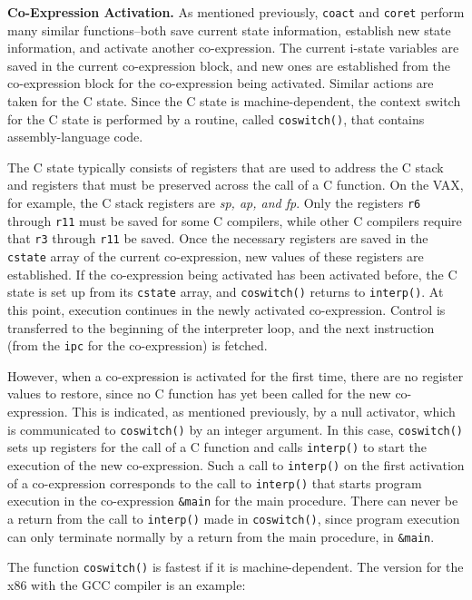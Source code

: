 \textbf{Co-Expression Activation.} As mentioned previously,
\texttt{coact} and \texttt{coret} perform many similar functions--both
save current state information, establish new state information, and
activate another co-expression.  The current i-state variables are
saved in the current co-expression block, and new ones are established
from the co-expression block for the co-expression being
activated. Similar actions are taken for the C state. Since the C
state is machine-dependent, the {\textquotedbl}context
switch{\textquotedbl} for the C state is performed by a routine,
called \texttt{coswitch()}, that contains assembly-language code.

The C state typically consists of registers that are used to address
the C stack and registers that must be preserved across the call of a
C function. On the VAX, for example, the C stack registers are
\textit{sp, ap, and fp}. Only the registers \texttt{r6} through
\texttt{r11} must be saved for some C compilers, while other C
compilers require that \texttt{r3} through \texttt{r11} be saved. Once
the necessary registers are saved in the \texttt{cstate} array of the
current co-expression, new values of these registers are
established. If the co-expression being activated has been activated
before, the C state is set up from its \texttt{cstate} array, and
\texttt{coswitch()} returns to \texttt{interp()}. At this point,
execution continues in the newly activated co-expression. Control is
transferred to the beginning of the interpreter loop, and the next
instruction (from the \texttt{ipc} for the co-expression) is fetched.

However, when a co-expression is activated for the first time, there
are no register values to restore, since no C function has yet been
called for the new co-expression. This is indicated, as mentioned
previously, by a null activator, which is communicated to
\texttt{coswitch()} by an integer argument. In this case,
\texttt{coswitch()} sets up registers for the call of a C function and
calls \texttt{interp()} to start the execution of the new
co-expression.  Such a call to \texttt{interp()} on the first
activation of a co-expression corresponds to the call to
\texttt{interp()} that starts program execution in the co-expression
\texttt{\&main} for the main procedure. There can never be a return
from the call to \texttt{interp()} made in \texttt{coswitch()}, since
program execution can only terminate normally by a return from the
main procedure, in \texttt{\&main}.

The function \texttt{coswitch()} is fastest if it is
machine-dependent. The version for the x86 with the GCC compiler is an
example:

